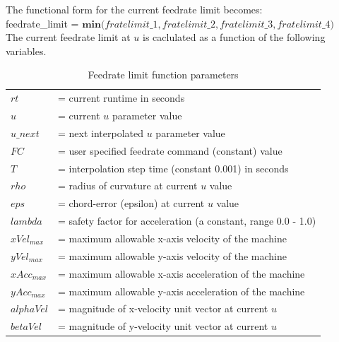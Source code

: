 \noindent The functional form for the current feedrate limit becomes: \\

\noindent feedrate\_limit = $\textbf{min}\Big (fratelimit\_1, fratelimit\_2, fratelimit\_3, fratelimit\_4 \Big)$ \\

\noindent The current feedrate limit at $u$ is caclulated as a function of the following variables.\\

\begin{table}[!ht]
	\begin{center}
		\caption{Feedrate limit function parameters}	
		\label{Feedrate-limit-parameters}	
		\begin{tabular}{ p{3.0cm} p{11.0cm} }
			\hline 
			$rt$               & = current runtime in seconds \\
			$u$                & = current $u$ parameter value \\
			$u\_next$          & = next interpolated $u$ parameter value \\
			$FC$               & = user specified feedrate command (constant) value  \\
			$T$                & = interpolation step time (constant 0.001) in seconds\\
			$rho$              & = radius of curvature at current $u$ value  \\ 
			$eps$              & = chord-error (epsilon) at current $u$ value \\
			$lambda$           & = safety factor for acceleration (a constant, range 0.0 - 1.0) \\ 
			$xVel_{max}$ & = maximum allowable x-axis velocity of the machine \\
			$yVel_{max}$ & = maximum allowable y-axis velocity of the machine \\
			$xAcc_{max}$ & = maximum allowable x-axis acceleration of the machine \\
			$yAcc_{max}$ & = maximum allowable y-axis acceleration of the machine \\
			$alphaVel$   & = magnitude of x-velocity unit vector at current $u$\\
			$betaVel$    & = magnitude of y-velocity unit vector at current $u$\\
			\hline
		\end{tabular}
	\end{center}
\end{table}

